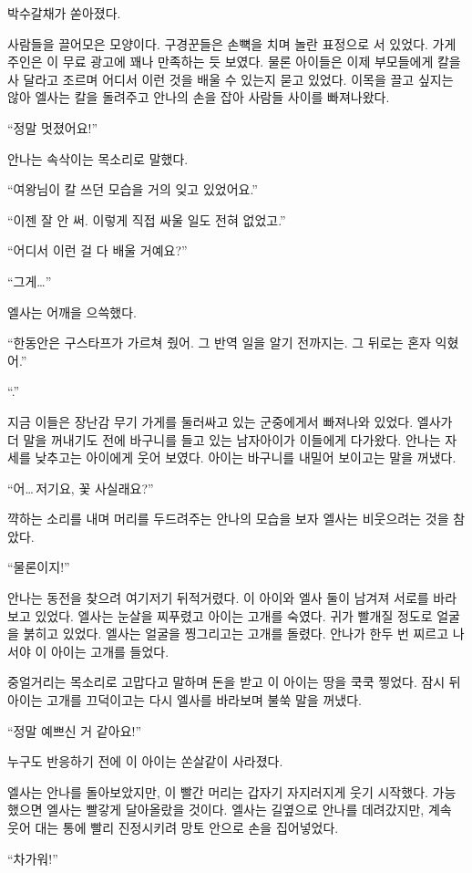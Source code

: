 박수갈채가 쏟아졌다.

사람들을 끌어모은 모양이다. 구경꾼들은 손뼉을 치며 놀란 표정으로 서 있었다. 가게 주인은 이 무료 광고에 꽤나 만족하는 듯 보였다. 물론 아이들은 이제 부모들에게 칼을 사 달라고 조르며 어디서 이런 것을 배울 수 있는지 묻고 있었다. 이목을 끌고 싶지는 않아 엘사는 칼을 돌려주고 안나의 손을 잡아 사람들 사이를 빠져나왔다.

``정말 멋졌어요!''

안나는 속삭이는 목소리로 말했다.

``여왕님이 칼 쓰던 모습을 거의 잊고 있었어요.''

``이젠 잘 안 써. 이렇게 직접 싸울 일도 전혀 없었고.''

``어디서 이런 걸 다 배울 거예요?''

``그게\ldots''

엘사는 어깨을 으쓱했다.

``한동안은 구스타프가 가르쳐 줬어. 그 반역 일을 알기 전까지는. 그 뒤로는 혼자 익혔어.''

``.''

지금 이들은 장난감 무기 가게를 둘러싸고 있는 군중에게서 빠져나와 있었다. 엘사가 더 말을 꺼내기도 전에 바구니를 들고 있는 남자아이가 이들에게 다가왔다. 안나는 자세를 낮추고는 아이에게 웃어 보였다. 아이는 바구니를 내밀어 보이고는 말을 꺼냈다.

``어\ldots\,저기요, 꽃 사실래요?''

꺅하는 소리를 내며 머리를 두드려주는 안나의 모습을 보자 엘사는 비웃으려는 것을 참았다.

``물론이지!''

안나는 동전을 찾으려 여기저기 뒤적거렸다. 이 아이와 엘사 둘이 남겨져 서로를 바라보고 있었다. 엘사는 눈살을 찌푸렸고 아이는 고개를 숙였다. 귀가 빨개질 정도로 얼굴을 붉히고 있었다. 엘사는 얼굴을 찡그리고는 고개를 돌렸다. 안나가 한두 번 찌르고 나서야 이 아이는 고개를 들었다.

중얼거리는 목소리로 고맙다고 말하며 돈을 받고 이 아이는 땅을 쿡쿡 찧었다. 잠시 뒤 아이는 고개를 끄덕이고는 다시 엘사를 바라보며 불쑥 말을 꺼냈다.

``정말 예쁘신 거 같아요!''

누구도 반응하기 전에 이 아이는 쏜살같이 사라졌다.

엘사는 안나를 돌아보았지만, 이 빨간 머리는 갑자기 자지러지게 웃기 시작했다. 가능했으면 엘사는 빨갛게 달아올랐을 것이다. 엘사는 길옆으로 안나를 데려갔지만, 계속 웃어 대는 통에 빨리 진정시키려 망토 안으로 손을 집어넣었다.

``차가워!''

